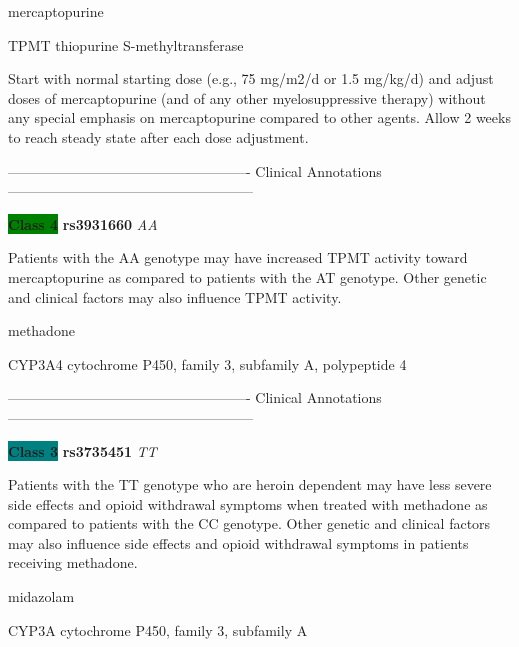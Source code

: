 \documentclass{resume} %
\begin{document}
\begin{rSection}{ mercaptopurine }
\begin{rSubsection}{ TPMT }{ thiopurine S-methyltransferase }{}{}
\item[] Start with normal starting dose (e.g., 75 mg/m2/d or 1.5 mg/kg/d) and adjust doses of mercaptopurine (and of any other myelosuppressive therapy) without any special emphasis on mercaptopurine compared to other agents. Allow 2 weeks to reach steady state after each dose adjustment.
\item[] ---------------------------------------------------- Clinical Annotations -----------------------------------------------------\newline
\item \textbf{\colorbox{green} {Class 4}} \textbf{ rs3931660 } \textit{ AA }
\item[] Patients with the AA genotype may have increased TPMT activity toward mercaptopurine as compared to patients with the AT genotype. Other genetic and clinical factors may also influence TPMT activity. 
\end{rSubsection}

\end{rSection}\begin{rSection}{ methadone }
\item[]

\begin{rSubsection}{ CYP3A4 }{ cytochrome P450, family 3, subfamily A, polypeptide 4 }{}{}
\item[]

\item[] ---------------------------------------------------- Clinical Annotations -----------------------------------------------------\newline
\item \textbf{\colorbox{teal} {Class 3}} \textbf{ rs3735451 } \textit{ TT }
\item[] Patients with the TT genotype who are heroin dependent may have less severe side effects and opioid withdrawal symptoms when treated with methadone as compared to patients with the CC genotype. Other genetic and clinical factors may also influence side effects and opioid withdrawal symptoms in patients receiving methadone.
\end{rSubsection}

\end{rSection}\begin{rSection}{ midazolam }
\item[]

\begin{rSubsection}{ CYP3A }{ cytochrome P450, family 3, subfamily A }{}{}
\item[]


\end{rSubsection}
\end{rSection}
\end{document}
